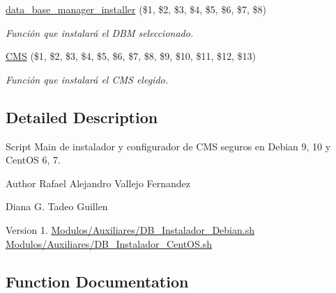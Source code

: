 \begin{DoxyCompactItemize}
\hyperlink{main_8sh_a1978233bd26781aa3df0b7e9ed3cf567}{data\+\_\+base\+\_\+manager\+\_\+installer} (\$1, \$2, \$3, \$4, \$5, \$6, \$7, \$8)
\begin{DoxyCompactList}\small\item\em Función que instalará el D\+BM seleccionado. \end{DoxyCompactList}\item 
\hyperlink{main_8sh_ad12ec286dbd629bd87a02fde36e82f94}{C\+MS} (\$1, \$2, \$3, \$4, \$5, \$6, \$7, \$8, \$9, \$10, \$11, \$12, \$13)
\begin{DoxyCompactList}\small\item\em Función que instalará el C\+MS elegido. \end{DoxyCompactList}\end{DoxyCompactItemize}


\subsection{Detailed Description}
Script Main de instalador y configurador de C\+MS seguros en Debian 9, 10 y Cent\+OS 6, 7. 

\begin{DoxyAuthor}{Author}
Rafael Alejandro Vallejo Fernandez 

Diana G. Tadeo Guillen 
\end{DoxyAuthor}
\begin{DoxyVersion}{Version}
1.  \hyperlink{DB__Instalador__Debian_8sh}{Modulos/\+Auxiliares/\+D\+B\+\_\+\+Instalador\+\_\+\+Debian.\+sh}  \hyperlink{DB__Instalador__CentOS_8sh}{Modulos/\+Auxiliares/\+D\+B\+\_\+\+Instalador\+\_\+\+Cent\+O\+S.\+sh} 
\end{DoxyVersion}


\subsection{Function Documentation}
\mbox{\label{main_8sh_ad12ec286dbd629bd87a02fde36e82f94}} 
